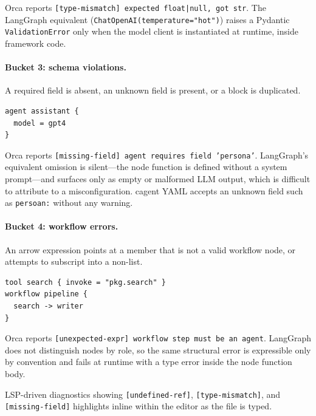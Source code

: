 \documentclass[sigconf,nonacm]{acmart}
\begin{document}
\noindent Orca reports \texttt{[type-mismatch] expected float|null, got
str}. The LangGraph equivalent (\texttt{ChatOpenAI(temperature="hot")})
raises a Pydantic \texttt{ValidationError} only when the model client is
instantiated at runtime, inside framework code.

\paragraph{Bucket 3: schema violations.} A required field is absent, an
unknown field is present, or a block is duplicated.

\begin{lstlisting}[caption={Schema violation: required field \texttt{persona} missing.},label={lst:err-schema}]
agent assistant {
  model = gpt4
}
\end{lstlisting}

\noindent Orca reports \texttt{[missing-field] agent requires field
'persona'}. LangGraph's equivalent omission is silent---the node function
is defined without a system prompt---and surfaces only as empty or
malformed LLM output, which is difficult to attribute to a
misconfiguration. cagent YAML accepts an unknown field such as
\texttt{persoan:} without any warning.

\paragraph{Bucket 4: workflow errors.} An arrow expression points at a
member that is not a valid workflow node, or attempts to subscript into a
non-list.

\begin{lstlisting}[caption={Workflow error: \texttt{tools} is not an agent.},label={lst:err-wf}]
tool search { invoke = "pkg.search" }
workflow pipeline {
  search -> writer
}
\end{lstlisting}

\noindent Orca reports \texttt{[unexpected-expr] workflow step must be an
agent}. LangGraph does not distinguish nodes by role, so the same
structural error is expressible only by convention and fails at runtime
with a type error inside the node function body.

\begin{imgplaceholder}[title={Screenshot: VS Code diagnostics on a broken \texttt{.oc}}]
LSP-driven diagnostics showing \texttt{[undefined-ref]},
\texttt{[type-mismatch]}, and \texttt{[missing-field]} highlights inline
within the editor as the file is typed.
\end{imgplaceholder}
\end{document}
